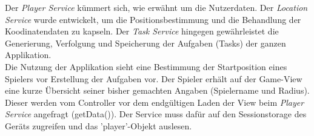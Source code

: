 Der \emph{Player Service} kümmert sich, wie erwähnt um die Nutzerdaten. Der \emph{Location Service} wurde entwickelt, um die Positionsbestimmung und die Behandlung der Koodinatendaten zu kapseln. Der \emph{Task Service} hingegen gewährleistet die Generierung, Verfolgung und Speicherung der Aufgaben (Tasks) der ganzen Applikation.
\\
Die Nutzung der Applikation sieht eine Bestimmung der Startposition eines Spielers vor Erstellung der Aufgaben vor. Der Spieler erhält auf der Game-View eine kurze Übersicht seiner bisher gemachten Angaben (Spielername und Radius). Dieser werden vom Controller vor dem endgültigen Laden der View beim \emph{Player Service} angefragt (getData()). Der Service muss dafür auf den Sessionstorage des Geräts zugreifen und das 'player'-Objekt auslesen.


